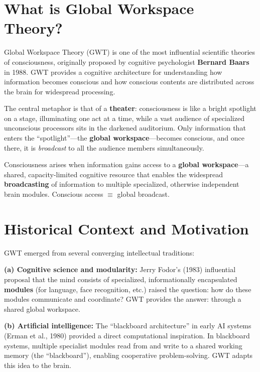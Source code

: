 \documentclass[11pt,a4paper]{report}
\begin{document}
\section{What is Global Workspace Theory?}

Global Workspace Theory (GWT) is one of the most influential scientific theories of consciousness, originally proposed by cognitive psychologist \textbf{Bernard Baars} in 1988. GWT provides a cognitive architecture for understanding how information becomes conscious and how conscious contents are distributed across the brain for widespread processing.

The central metaphor is that of a \textbf{theater}: consciousness is like a bright spotlight on a stage, illuminating one act at a time, while a vast audience of specialized unconscious processors sits in the darkened auditorium. Only information that enters the ``spotlight''---the \textbf{global workspace}---becomes conscious, and once there, it is \emph{broadcast} to all the audience members simultaneously.

\begin{definitionbox}
Consciousness arises when information gains access to a \textbf{global workspace}---a shared, capacity-limited cognitive resource that enables the widespread \textbf{broadcasting} of information to multiple specialized, otherwise independent brain modules. Conscious access $\equiv$ global broadcast.
\end{definitionbox}

\section{Historical Context and Motivation}

GWT emerged from several converging intellectual traditions:

\textbf{(a) Cognitive science and modularity:} Jerry Fodor's (1983) influential proposal that the mind consists of specialized, informationally encapsulated \textbf{modules} (for language, face recognition, etc.) raised the question: how do these modules communicate and coordinate? GWT provides the answer: through a shared global workspace.

\textbf{(b) Artificial intelligence:} The ``blackboard architecture'' in early AI systems (Erman et al., 1980) provided a direct computational inspiration. In blackboard systems, multiple specialist modules read from and write to a shared working memory (the ``blackboard''), enabling cooperative problem-solving. GWT adapts this idea to the brain.
\end{document}

